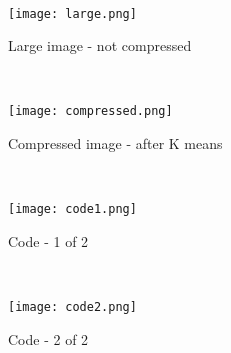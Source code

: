 \begin{answer}\\
\begin{figure}
  \texttt{[image: large.png]}
  \caption{Large image - not compressed}
  \label{Large image - not compressed}
\end{figure}\\
\begin{figure}
  \texttt{[image: compressed.png]}
  \caption{Compressed image - after K means}
  \label{Compressed image - after K means}
\end{figure}\\
\begin{figure}
  \texttt{[image: code1.png]}
  \caption{Code - 1 of 2}
  \label{Code - 1 of 2}
\end{figure}\\
\begin{figure}
  \texttt{[image: code2.png]}
  \caption{Code - 2 of 2}
  \label{Code - 2 of 2}
\end{figure}\\
\end{answer}
